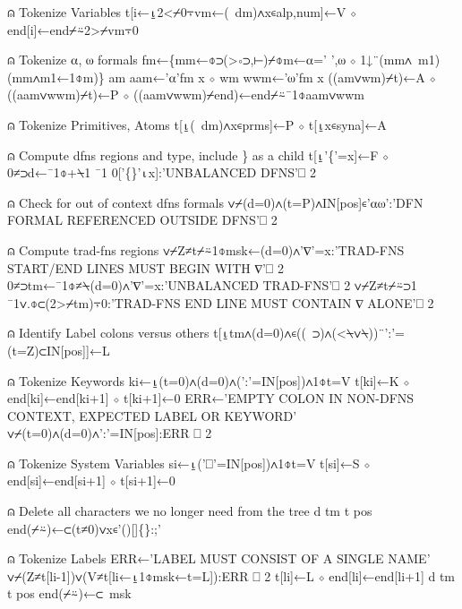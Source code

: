 \documentclass{article}%
\begin{document}
⍝ Tokenize Variables
         t[i←⍸2<⌿0⍪vm←(~dm)∧x∊alp,num]←V ⋄ end[i]←end⌿⍨2>⌿vm⍪0

⍝ Tokenize ⍺, ⍵ formals
         fm←\{mm←⌽⊃(>∘⊃,⊢)⌿⌽m←⍺=' ',⍵ ⋄ 1↓¨(mm∧~m1)(mm∧m1←1⌽m)\}
         am aam←'⍺'fm x ⋄ wm wwm←'⍵'fm x
         ((am∨wm)⌿t)←A ⋄ ((aam∨wwm)⌿t)←P ⋄ ((aam∨wwm)⌿end)←end⌿⍨¯1⌽aam∨wwm

⍝ Tokenize Primitives, Atoms
         t[⍸(~dm)∧x∊prms]←P ⋄ t[⍸x∊syna]←A

⍝ Compute dfns regions and type, include \} as a child
         t[⍸'\{'=x]←F ⋄ 0≠⊃d←¯1⌽+⍀1 ¯1 0['\{\}'⍳x]:'UNBALANCED DFNS'⎕ 2

⍝ Check for out of context dfns formals
         ∨⌿(d=0)∧(t=P)∧IN[pos]∊'⍺⍵':'DFN FORMAL REFERENCED OUTSIDE DFNS'⎕ 2

⍝ Compute trad-fns regions
         ∨⌿Z≠t⌿⍨1⌽msk←(d=0)∧'∇'=x:'TRAD-FNS START/END LINES MUST BEGIN WITH ∇'⎕ 2
         0≠⊃tm←¯1⌽≠⍀(d=0)∧'∇'=x:'UNBALANCED TRAD-FNS'⎕ 2
         ∨⌿Z≠t⌿⍨⊃1 ¯1∨.⌽⊂(2>⌿tm)⍪0:'TRAD-FNS END LINE MUST CONTAIN ∇ ALONE'⎕ 2

⍝ Identify Label colons versus others
         t[⍸tm∧(d=0)∧∊((~⊃)∧(<⍀∨⍀))¨':'=(t=Z)⊂IN[pos]]←L

⍝ Tokenize Keywords
         ki←⍸(t=0)∧(d=0)∧(':'=IN[pos])∧1⌽t=V
         t[ki]←K ⋄ end[ki]←end[ki+1] ⋄ t[ki+1]←0
         ERR←'EMPTY COLON IN NON-DFNS CONTEXT, EXPECTED LABEL OR KEYWORD'
         ∨⌿(t=0)∧(d=0)∧':'=IN[pos]:ERR ⎕ 2

⍝ Tokenize System Variables
         si←⍸('⎕'=IN[pos])∧1⌽t=V
         t[si]←S ⋄ end[si]←end[si+1] ⋄ t[si+1]←0

⍝ Delete all characters we no longer need from the tree
         d tm t pos end(⌿⍨)←⊂(t≠0)∨x∊'()[]\{\}:;'

⍝ Tokenize Labels
         ERR←'LABEL MUST CONSIST OF A SINGLE NAME'
         ∨⌿(Z≠t[li-1])∨(V≠t[li←⍸1⌽msk←t=L]):ERR ⎕ 2
         t[li]←L ⋄ end[li]←end[li+1]
         d tm t pos end(⌿⍨)←⊂~msk
\nwendcode{}\nwdocspar
\end{document}
